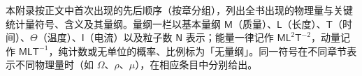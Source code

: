
本附录按正文中首次出现的先后顺序（按章分组），列出全书出现的物理量与关键统计量符号、含义及其量纲。量纲一栏以基本量纲 $\mathsf{M}$（质量）、$\mathsf{L}$（长度）、$\mathsf{T}$（时间）、$\Theta$（温度）、$\mathsf{I}$（电流）以及粒子数 $\mathsf{N}$ 表示；能量一律记作 $\mathsf{M}\mathsf{L}^2\mathsf{T}^{-2}$，动量记作 $\mathsf{M}\mathsf{L}\mathsf{T}^{-1}$，纯计数或无单位的概率、比例标为「无量纲」。同一符号在不同章节表示不同物理量时（如 $\Omega$、$\rho$、$\mu$），在相应条目中分别给出。

